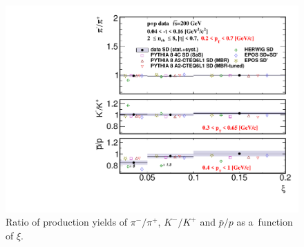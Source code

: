 \begin{figure}[b!]
	\centering
	\includegraphics[width=.99\textwidth,page=1]{chapters/chrgSTAR/img/results/ratio_xi.pdf}
	\caption{Ratio of production yields of $\pi^-/\pi^+$, $K^-/K^+$ and $\bar{p}/p$ as a~function of $\xi$. }
	\label{fig:results_mean_ratio_star}
	
\end{figure}